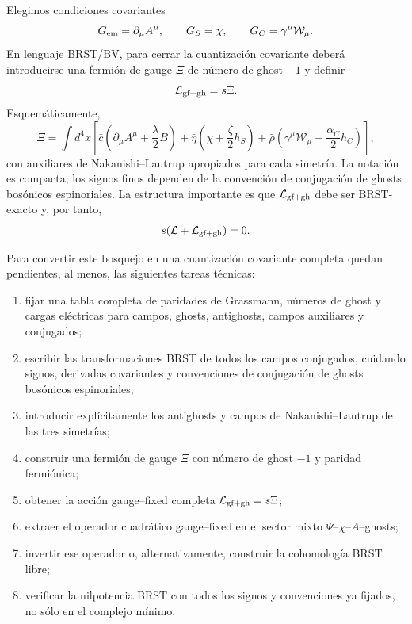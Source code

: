 \documentclass[11pt,a4paper]{article}
\numberwithin{equation}{section}
\newcommand{\Wcal}{\mathcal W}
\newcommand{\Lcal}{\mathcal L}
\begin{document}
Elegimos condiciones covariantes
\begin{equation}
G_{\rm em}=\partial_\mu A^\mu,
\qquad
G_S=\chi,
\qquad
G_C=\gamma^\mu\Wcal_\mu.
\end{equation}
En lenguaje BRST/BV, para cerrar la cuantización covariante deberá introducirse una fermión de gauge $\Xi$ de número de ghost $-1$ y definir
\begin{equation}
\Lcal_{\rm gf+gh}=s\Xi.
\end{equation}
Esquemáticamente,
\begin{equation}
\Xi=\int d^4x\left[
\bar c\left(\partial_\mu A^\mu+\frac{\lambda}{2}B\right)
+\bar\eta\left(\chi+\frac{\zeta}{2}h_S\right)
+\bar\rho\left(\gamma^\mu\Wcal_\mu+\frac{\alpha_C}{2}h_C\right)
\right],
\end{equation}
con auxiliares de Nakanishi--Lautrup apropiados para cada simetría. La notación es compacta; los signos finos dependen de la convención de conjugación de ghosts bosónicos espinoriales. La estructura importante es que $\Lcal_{\rm gf+gh}$ debe ser BRST-exacto y, por tanto,
\begin{equation}
s(\Lcal+\Lcal_{\rm gf+gh})=0.
\end{equation}

Para convertir este bosquejo en una cuantización covariante completa quedan pendientes, al menos, las siguientes tareas técnicas:
\begin{enumerate}[label=(\roman*)]
\item fijar una tabla completa de paridades de Grassmann, números de ghost y cargas eléctricas para campos, ghosts, antighosts, campos auxiliares y conjugados;
\item escribir las transformaciones BRST de todos los campos conjugados, cuidando signos, derivadas covariantes y convenciones de conjugación de ghosts bosónicos espinoriales;
\item introducir explícitamente los antighosts y campos de Nakanishi--Lautrup de las tres simetrías;
\item construir una fermión de gauge $\Xi$ con número de ghost $-1$ y paridad fermiónica;
\item obtener la acción gauge--fixed completa $\Lcal_{\rm gf+gh}=s\Xi$;
\item extraer el operador cuadrático gauge--fixed en el sector mixto $\Psi$--$\chi$--$A$--ghosts;
\item invertir ese operador o, alternativamente, construir la cohomología BRST libre;
\item verificar la nilpotencia BRST con todos los signos y convenciones ya fijados, no sólo en el complejo mínimo.
\end{enumerate}
\end{document}
